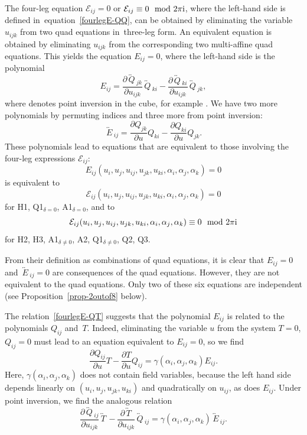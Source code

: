 \documentclass[10pt,a4paper]{amsart}
\newcommand{\inversion}[1]{\!\overleftrightarrow{\,#1\,}\!}
\newcommand{\pdv}[2]{\frac{\partial {#1}}{\partial {#2}}}
\numberwithin{equation}{section}
\begin{document}
The four-leg equation $\mathcal E_{ij} = 0$ or $\mathcal E_{ij} \equiv 0 \mod 2 \pi {\rm i}$, where the left-hand side is defined in~equation~\eqref{fourlegE-QQ}, can be obtained by eliminating the variable $u_{ijk}$ from two quad equations in~three-leg form. An equivalent equation is obtained by eliminating $u_{ijk}$ from the corresponding two multi-affine quad equations. This yields the equation $E_{ij} = 0$, where the left-hand side is the polynomial
\begin{equation}\label{E-Q}
 E_{ij} = \pdv{\inversion Q_{jk}}{u_{ijk}} \inversion{Q}_{ki} - \pdv{\inversion{Q}_{ki}}{u_{ijk}} \inversion{Q}_{jk} ,
\end{equation}
where \smash{$\inversion{\cdot}$} denotes point inversion in the cube, for example \smash{$\inversion Q_{jk} = Q(u_{ijk},u_{ki},u_{ij},u_{i},\alpha_j-\alpha_k)$}.
We have two more polynomials by permuting indices and three more from point inversion:
\begin{equation}
\label{E-Q-invert}
\inversion{E}_{ij} = \pdv{Q_{jk}}{u} Q_{ki} - \pdv{Q_{ki}}{u} Q_{jk} .
\end{equation}
These polynomials lead to equations that are equivalent to those involving the four-leg expressions $\mathcal{E}_{ij}$:
\[ E_{ij}(u_i,u_j,u_{ij},u_{jk},u_{ki},\alpha_i,\alpha_j,\alpha_k) = 0\]
is equivalent to
\[ \mathcal{E}_{ij}(u_i,u_j,u_{ij},u_{jk},u_{ki},\alpha_i,\alpha_j,\alpha_k) = 0 \]
for H1, Q1$_{\delta=0}$, A1$_{\delta=0}$, and to
\[ \mathcal{E}_{ij}(u_i,u_j,u_{ij},u_{jk},u_{ki},\alpha_i,\alpha_j,\alpha_k) \equiv 0 \mod 2 \pi {\rm i} \]
for H2, H3, A1$_{\delta\neq0}$, A2, Q1$_{\delta\neq0}$, Q2, Q3.

From their definition as combinations of quad equations, it is clear that $E_{ij}=0$ and $\inversion E_{ij}=0$ are consequences of the quad equations. However, they are not equivalent to the quad equations. Only two of these six equations are independent (see Proposition~\ref{prop-2outof8} below).

The relation~\eqref{fourlegE-QT} suggests that the polynomial $E_{ij}$ is related to the polynomials $Q_{ij}$ and~$T$. Indeed, eliminating the variable $u$ from the system $T=0$, $Q_{ij}=0$ must lead to an equation equivalent to $E_{ij} = 0$, so we find
\begin{equation}\label{TQE-rel}
 \pdv{Q_{ij}}{u} T - \pdv{T}{u} Q_{ij} = \gamma(\alpha_i,\alpha_j,\alpha_k) E_{ij} .
\end{equation}
Here, $\gamma(\alpha_i,\alpha_j,\alpha_k)$ does not contain field variables, because the left hand side depends linearly on $(u_i,u_j,u_{jk},u_{ki})$ and quadratically on $u_{ij}$, as does $E_{ij}$.
Under point inversion, we find the analogous relation
\begin{equation*} \pdv{\inversion Q_{ij}}{u_{ijk}} \inversion T - \pdv{\inversion T}{u_{ijk}} \inversion Q_{ij} = \gamma(\alpha_i,\alpha_j,\alpha_k) \inversion E_{ij} .
\end{equation*}
\end{document}

